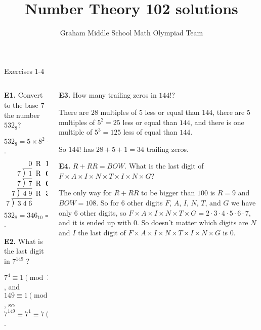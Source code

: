 \documentclass[9pt,aspectratio=169]{beamer}
\title{Number Theory 102 solutions}
\subtitle[Graham Middle School]{Graham Middle School Math Olympiad Team}
\newcommand\Mydiv[2]{%
$\strut#1$\kern.25em\smash{\raise.3ex\hbox{$\big)$}}$\mkern-8mu
        \overline{\enspace\strut#2}$}
\begin{document}
\maketitle

\begin{frame}{Exercises 1-4}
  \begin{columns}[T]
    \begin{column}{0.5\textwidth}
      \begin{problem}
        \textbf{E1.} Convert to the base $7$ the number $532_8$?
      \end{problem}
      $532_8 = 5 \times 8^2 + 3 \times 8 + 2 = 320 + 24 + 2 = 346_{10}$.
      \[
        \setlength\arraycolsep{0.6ex}
        \begin{array}{rl}
          0 & \text{R}\ \ \mathbf{1} \\
          $\Mydiv{7}{\ 1}$ & \text{R}\ \ \mathbf{0} \\
          $\Mydiv{7}{\ 7}$ & \text{R}\ \ \mathbf{0} \\
          $\Mydiv{7}{\ 4\;9}$ & \text{R}\ \ \mathbf{3} \\
          $\Mydiv{7}{\ 3\;4\;6}$ &
        \end{array}
      \]
      $532_8 = 346_{10} = \boxed{1003_{7}}$.
      \begin{problem}
        \textbf{E2.} What is the last digit in $7^{149}$ ?
      \end{problem}
      $7^4 \equiv 1 \pmod{10}$, and $149 \equiv 1 \pmod{4}$, so $7^{149} \equiv 7^{1} \equiv \boxed{7} \pmod{10}$.  
    \end{column}
    \begin{column}{0.5\textwidth}
      \begin{problem}
        \textbf{E3.} How many trailing zeros in $144!$?
      \end{problem}
      There are $28$ multiples of $5$ less or equal than $144$, there are $5$ multiples of $5^2 = 25$ less or equal than $144$, and there is one multiple of $5^3 = 125$ less of equal than $144$. 
      
      So $144!$ has $28 + 5 + 1 = \boxed{34}$ trailing zeros. 
      \begin{problem}
        \textbf{E4.} $R + RR = BOW$. What is the last digit of $F \times A \times I \times N \times T \times I \times N \times G$?
      \end{problem}
      The only way for $R + RR$ to be bigger than $100$ is $R = 9$ and $BOW = 108$. So for $6$ other digits $F$, $A$, $I$, $N$, $T$, and $G$ we have only $6$ other digits, so $F \times A \times I \times N \times T \times G = 2 \cdot 3 \cdot 4 \cdot 5 \cdot 6 \cdot 7$, and it is ended up with $0$. So doesn't matter which digits are $N$ and $I$ the last digit of $F \times A \times I \times N \times T \times I \times N \times G$ is $\boxed{0}$.
    \end{column}
  \end{columns}
\end{frame}
\end{document}
